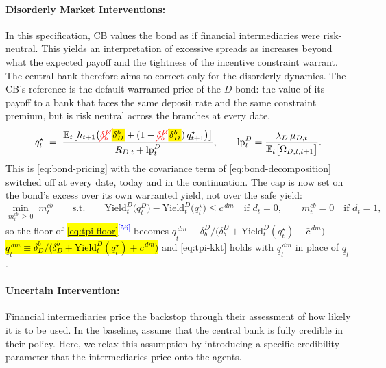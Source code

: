 \documentclass[11pt]{article}
\newcommand{\E}{\mathbb{E}}
\newcommand{\A}[1]{\hl{#1}}
\newcommand{\D}[1]{{\color{red}\st{#1}}}
\newcommand{\Am}[1]{\mathchoice
  {{\setlength{\fboxsep}{1pt}\colorbox{yellow}{$\displaystyle #1$}}}
  {{\setlength{\fboxsep}{1pt}\colorbox{yellow}{$\textstyle #1$}}}
  {{\setlength{\fboxsep}{1pt}\colorbox{yellow}{$\scriptstyle #1$}}}
  {{\setlength{\fboxsep}{1pt}\colorbox{yellow}{$\scriptscriptstyle #1$}}}}
\newcommand{\Dm}[1]{{\color{red}\cancel{#1}}}
\newcommand{\chg}[1]{\textsuperscript{\textcolor{blue}{\scriptsize[#1]}}}
\begin{document}
\paragraph{Disorderly Market Interventions:} In this specification,  CB values the bond as if financial intermediaries were risk-neutral. This yields an interpretation of excessive spreads as increases beyond what the expected payoff and the tightness of the incentive constraint warrant. The central bank therefore aims to correct only for the disorderly dynamics.  The CB's reference is the default-warranted price of the $D$ bond: the value of its payoff to a bank that faces the same deposit rate and the same constraint premium, but is risk neutral across the branches at every date,
\begin{equation}
q^{\star}_t\;=\;\frac{\E_t\bigl[h_{t+1}\bigl(\Dm{\delta_b^D}\Am{\delta^b_D}+(1-\Dm{\delta_b^D}\Am{\delta^b_D})\,q^{\star}_{t+1}\bigr)\bigr]}
                   {R_{D,t}+\mathrm{lp}^{D}_t},\qquad
\mathrm{lp}^{D}_t=\frac{\lambda_D\,\mu_{D,t}}{\E_t\bigl[\Omega_{D,t,t+1}\bigr]}.
\label{eq:q-warranted}
\end{equation}
This is \eqref{eq:bond-pricing} with the covariance term of \eqref{eq:bond-decomposition} switched off at every date, today and in the
continuation. The cap is now set on the bond's excess over its own warranted yield,
not over the safe yield:
\begin{equation}
\min_{m^{cb}_t\,\ge\,0}\;m^{cb}_t
\qquad\text{s.t.}\qquad
\text{Yield}_t^D\bigl(q^{D}_t\bigr)-\text{Yield}_t^D\bigl(q^{\star}_t\bigr)\le\bar c^{\,dm}
\quad\text{if } d_t=0,
\qquad
m^{cb}_t=0\quad\text{if } d_t=1,
\label{eq:cb-objective-dm}
\end{equation}
so the floor of \A{\eqref{eq:tpi-floor}}\chg{56} becomes \D{$\underline q^{\,dm}_t\equiv\delta_b^D/\bigl(\delta_b^D+\text{Yield}_t^D(q^{\star}_t)+\bar c^{\,dm}\bigr)$}\\ \A{$\underline q^{\,dm}_t\equiv\delta^b_D/\bigl(\delta^b_D+\text{Yield}_t^D(q^{\star}_t)+\bar c^{\,dm}\bigr)$} and \eqref{eq:tpi-kkt} holds with $\underline q^{\,dm}_t$ in place of $\underline q_t$.

\paragraph{Uncertain Intervention: }Financial intermediaries price the backstop through their assessment of how likely it is to be used. In the baseline, assume that the central bank is fully credible in their policy. Here, we relax this assumption by introducing a specific credibility parameter that the intermediaries price onto the agents.
\end{document}
